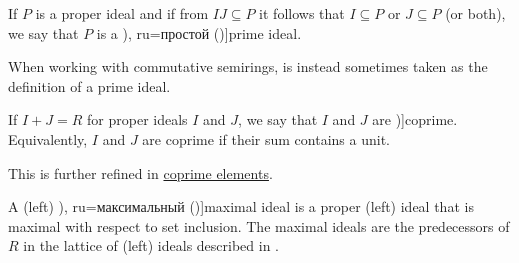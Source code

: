 \begin{definition}
\begin{thmenum}[resume=def:semiring_ideal]
     If \( P \) is a proper ideal and if from \( IJ \subseteq P \) it follows that \( I \subseteq P \) or \( J \subseteq P \) (or both), we say that \( P \) is a \term[bg=прост (\cite[7]{КоцевСидеров2016}), ru=простой (\cite[14]{ВечтомовПетров2022})]{prime ideal}.

    When working with commutative semirings,  is instead sometimes taken as the definition of a prime ideal.

     If \( I + J = R \) for proper ideals \( I \) and \( J \), we say that \( I \) and \( J \) are \term[bg=взаимно прости (\cite[18]{КоцевСидеров2016})]{coprime}. Equivalently, \( I \) and \( J \) are coprime if their sum contains a unit.

    This is further refined in \hyperref[def:coprime_elements]{coprime elements}.

     A (left) \term[bg=максимален (\cite[7]{КоцевСидеров2016}), ru=максимальный (\cite[13]{ВечтомовПетров2022})]{maximal ideal} is a proper (left) ideal that is maximal with respect to set inclusion. The maximal ideals are the predecessors of \( R \) in the lattice of (left) ideals described in .
  \end{thmenum}
\end{definition}

